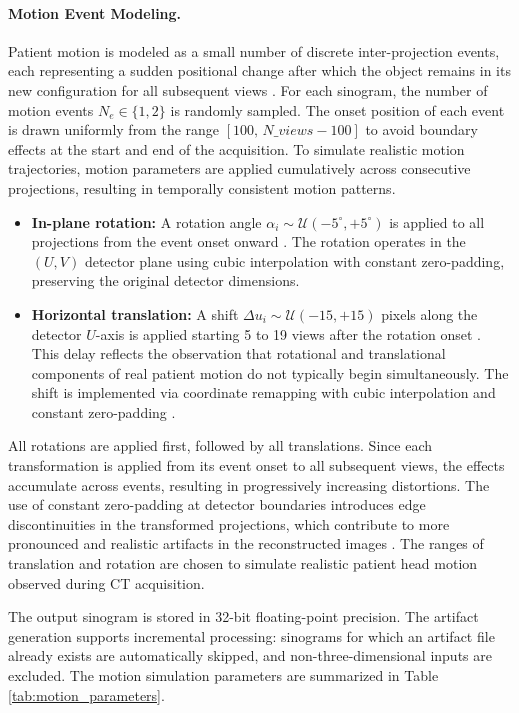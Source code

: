 \paragraph{Motion Event Modeling.}
Patient motion is modeled as a small number of discrete inter-projection events, each representing a sudden positional change after which the object remains in its new configuration for all subsequent views \cite{thies2025_cbctmotion}. For each sinogram, the number of motion events  $N_e \in \{1, 2\}$ is randomly sampled. The onset position of each event is drawn uniformly from the range $[100,\, N\_{views}-100]$ to avoid boundary effects at the start and end of the acquisition. To simulate realistic motion trajectories, motion parameters are applied cumulatively across consecutive projections, resulting in temporally consistent motion patterns. 
\begin{itemize}
\item \textbf{In-plane rotation:} A rotation angle $\alpha_i \sim \mathcal{U}(-5^\circ, +5^\circ)$ is applied to all projections from the event onset onward \cite{thies2025_cbctmotion}. The rotation operates in the $(U, V)$ detector plane using cubic interpolation with constant zero-padding, preserving the original detector dimensions.

\item \textbf{Horizontal translation:} A shift $\Delta u_i \sim \mathcal{U}(-15, +15)$ pixels along the detector $U$-axis is applied starting 5 to 19 views after the rotation onset \cite{thies2025_cbctmotion}. This delay reflects the observation that rotational and translational components of real patient motion do not typically begin simultaneously. The shift is implemented via coordinate remapping with cubic interpolation and constant zero-padding \cite{Gonzalez2008}.
\end{itemize}
All rotations are applied first, followed by all translations. Since each transformation is applied from its event onset to all subsequent views, the effects accumulate across events, resulting in progressively increasing distortions. The use of constant zero-padding at detector boundaries introduces edge discontinuities in the transformed projections, which contribute to more pronounced and realistic artifacts in the reconstructed images \cite{wagner2003quantification}.
The ranges of translation and rotation are chosen to simulate realistic patient head motion observed during CT acquisition. 

The output sinogram is stored in 32-bit floating-point precision. The artifact generation supports incremental processing: sinograms for which an artifact file already exists are automatically skipped, and non-three-dimensional inputs are excluded.
The motion simulation parameters are summarized in Table \ref{tab:motion_parameters}. 

